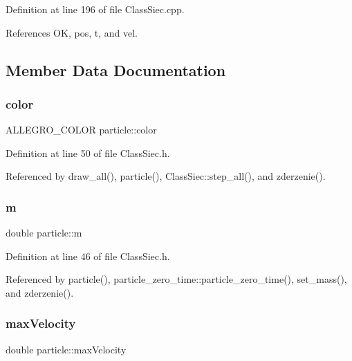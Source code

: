 Definition at line 196 of file Class\+Siec.\+cpp.



References OK, pos, t, and vel.



\subsection{Member Data Documentation}
\mbox{\label{structparticle_a7ea0e8707e7e91c3f298c5881bce4581}} 
\subsubsection{\texorpdfstring{color}{color}}
{\footnotesize\ttfamily A\+L\+L\+E\+G\+R\+O\+\_\+\+C\+O\+L\+OR particle\+::color}



Definition at line 50 of file Class\+Siec.\+h.



Referenced by draw\+\_\+all(), particle(), Class\+Siec\+::step\+\_\+all(), and zderzenie().

\mbox{\label{structparticle_a4cb4f184e6cd2b5dc0dc555d14f265dd}} 
\subsubsection{\texorpdfstring{m}{m}}
{\footnotesize\ttfamily double particle\+::m}



Definition at line 46 of file Class\+Siec.\+h.



Referenced by particle(), particle\+\_\+zero\+\_\+time\+::particle\+\_\+zero\+\_\+time(), set\+\_\+mass(), and zderzenie().

\mbox{\label{structparticle_a2ea1a35ec678df5cc776dfd6bd377fad}} 
\subsubsection{\texorpdfstring{max\+Velocity}{maxVelocity}}
{\footnotesize\ttfamily double particle\+::max\+Velocity}



